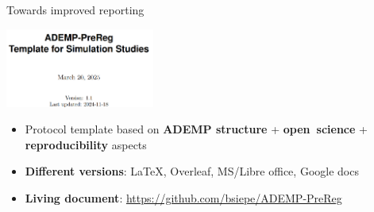 \documentclass[english, 12pt, aspectratio=169]{beamer}
\begin{document}
\begin{frame}{Towards improved reporting}
  \begin{block}{}
  \centering
  \includegraphics[width = 0.6\linewidth,frame,height=7em]{pics/ademprereg.png}

  \begin{itemize}
  \pause
    \item Protocol template based on \alert{\textbf{ADEMP structure}}
          \citep{Morris2019} + \alert{\textbf{open~science}} +
          \alert{\textbf{reproducibility}} aspects
    \pause
    \item \alert{\textbf{Different versions}}: \LaTeX, Overleaf, MS/Libre office, Google
    docs
    \pause
    \item \alert{\textbf{Living
          document}}:          \href{https://github.com/bsiepe/ADEMP-PreReg}{https://github.com/bsiepe/ADEMP-PreReg}
    \end{itemize}
  \end{block}

  \vspace{-1.5em}
  \nocite{Siepe2023}

\end{frame}
\end{document}

